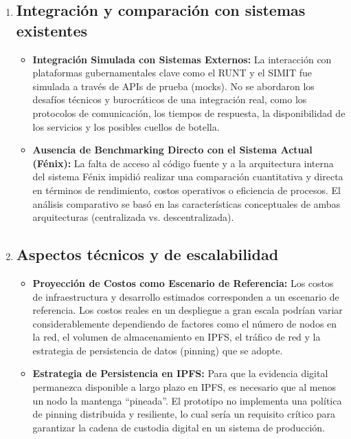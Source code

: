 \begin{enumerate}
    \item \subsection{Integración y comparación con sistemas existentes}
    \begin{itemize}
        \item \textbf{Integración Simulada con Sistemas Externos:} La interacción con plataformas gubernamentales clave como el RUNT y el SIMIT fue simulada a través de APIs de prueba (mocks). No se abordaron los desafíos técnicos y burocráticos de una integración real, como los protocolos de comunicación, los tiempos de respuesta, la disponibilidad de los servicios y los posibles cuellos de botella.
        \item \textbf{Ausencia de Benchmarking Directo con el Sistema Actual (Fénix):} La falta de acceso al código fuente y a la arquitectura interna del sistema Fénix impidió realizar una comparación cuantitativa y directa en términos de rendimiento, costos operativos o eficiencia de procesos. El análisis comparativo se basó en las características conceptuales de ambas arquitecturas (centralizada vs. descentralizada).
    \end{itemize}

    \item \subsection{Aspectos técnicos y de escalabilidad}
    \begin{itemize}
        \item \textbf{Proyección de Costos como Escenario de Referencia:} Los costos de infraestructura y desarrollo estimados corresponden a un escenario de referencia. Los costos reales en un despliegue a gran escala podrían variar considerablemente dependiendo de factores como el número de nodos en la red, el volumen de almacenamiento en IPFS, el tráfico de red y la estrategia de persistencia de datos (pinning) que se adopte.
        \item \textbf{Estrategia de Persistencia en IPFS:} Para que la evidencia digital permanezca disponible a largo plazo en IPFS, es necesario que al menos un nodo la mantenga ``pineada''. El prototipo no implementa una política de pinning distribuida y resiliente, lo cual sería un requisito crítico para garantizar la cadena de custodia digital en un sistema de producción.
    \end{itemize}


\end{enumerate}
